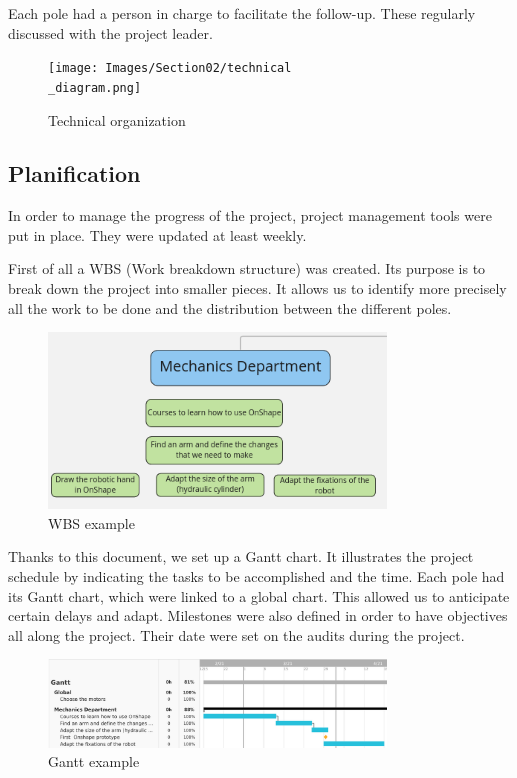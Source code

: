 \bigbreak
Each pole had a person in charge to facilitate the follow-up. These regularly discussed with the project leader.

\begin{figure}[ht]
    \centering
    \texttt{[image: Images/Section02/technical\\\_diagram.png]}
    \caption{Technical organization}
    \label{fig:techOrga}
\end{figure}
\FloatBarrier

\subsection{Planification}

In order to manage the progress of the project, project management tools were put in place. They were updated at least weekly.

\bigbreak
First of all a WBS (Work breakdown structure) was created. Its purpose is to break down the project into smaller pieces. It allows us to identify more precisely all the work to be done and the distribution between the different poles. 

\begin{figure}[ht]
    \centering
    \includegraphics[width=0.8\textwidth]{Images/Section02/wbs.png}
    \caption{WBS example}
    \label{fig:WBSextract}
\end{figure}
\FloatBarrier

\bigbreak
Thanks to this document, we set up a Gantt chart. It illustrates the project schedule by indicating the tasks to be accomplished and the time. Each pole had its Gantt chart, which were linked to a global chart. This allowed us to anticipate certain delays and adapt. Milestones were also defined in order to have objectives all along the project. Their date were set on the audits during the project.

\begin{figure}[ht]
    \centering
    \includegraphics[width=0.8\textwidth]{Images/Section02/gantt.png}
    \caption{Gantt example}
    \label{fig:GANTTextract}
\end{figure}
\FloatBarrier

